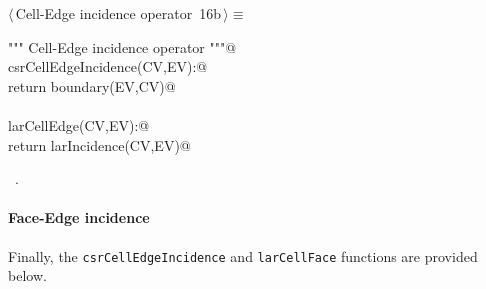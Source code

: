 \documentclass[11pt,oneside]{article}	%
\begin{document}
\begin{flushleft} \small \label{scrap28}
\protect{}$\langle\,$Cell-Edge incidence operator\nobreak\ {\footnotesize 16b}$\,\rangle\equiv$
\vspace{-1ex}
\begin{list}{}{} \item
\mbox{}\verb@""" Cell-Edge incidence operator """@\\
\mbox{}\verb@def csrCellEdgeIncidence(CV,EV):@\\
\mbox{}\verb@    return boundary(EV,CV)@\\
\mbox{}\verb@@\\
\mbox{}\verb@def larCellEdge(CV,EV):@\\
\mbox{}\verb@   return larIncidence(CV,EV)@\\
\mbox{}\verb@@{\NWsep}
\end{list}
\vspace{-1ex}
\footnotesize\addtolength{\baselineskip}{-1ex}
\begin{list}{}{\setlength{\itemsep}{-\parsep}\setlength{\itemindent}{-\leftmargin}}
\item \NWtxtMacroRefIn\ .
\end{list}
\end{flushleft}

\paragraph{Face-Edge incidence}
Finally, the \texttt{csrCellEdgeIncidence} and \texttt{larCellFace} functions are provided below.
\end{document}

